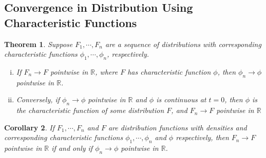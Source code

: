 \documentclass[12pt]{article}
\newcommand{\rr}{\mathbb{R}}
\theoremstyle{plain}
\newtheorem{theorem}{Theorem}
\newtheorem{corollary}[theorem]{Corollary}
\theoremstyle{definition}
\newtheorem*{definition}{Definition}
\theoremstyle{remark}
\numberwithin{equation}{section}  %
\begin{document}
\subsection{Convergence in Distribution Using Characteristic Functions}
\begin{theorem}\label{thm:conv-char-dist}
	Suppose $F_{1}, \cdots, F_{n}$ are a sequence of distributions
with corresponding characteristic functions
	$\phi_{1}, \cdots, \phi_{n}$, respectively. 
	\begin{enumerate}[(i)]
		\item If $F_{n} \to F$ pointwise in $\rr$,
			where $F$ has characteristic function
			$\phi$, then $\phi_{n} \to \phi$ pointwise in $\rr$.
		\item Conversely, if  $\phi_{n} \to \phi$ pointwise in $\rr$ and 
			$\phi$ is continuous at $t = 0$, then $\phi$ is the characteristic
			function of some distribution $F$, and $F_{n} \to F$ pointwise
			in $\rr$
	\end{enumerate}
\end{theorem}
\begin{corollary}
	If $F_{1}, \cdots, F_{n}$ and $F$ are distribution functions with densities
	and corresponding characteristic functions $\phi_{1}, \cdots, \phi_{n}$ and
	$\phi$ respectively, then $F_{n} \to F$ pointwise in $\rr$ if and only if
	$\phi_{n} \to \phi$ pointwise in $\rr$.
\end{corollary}
\end{document}
